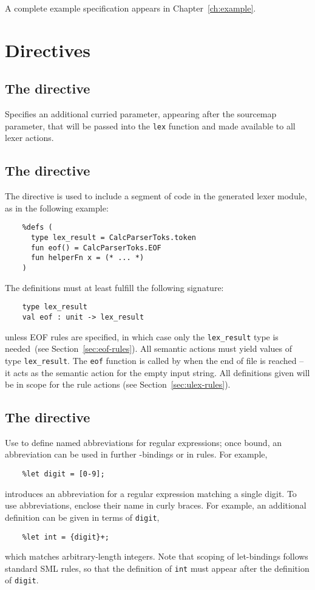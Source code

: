 A complete example specification appears in Chapter~\ref{ch:example}.

\section{Directives}

\subsection{The  directive}

Specifies an additional curried parameter, appearing after the sourcemap parameter, that will be passed into the \texttt{lex} function and made available to all lexer actions.

\subsection{The  directive}

The  directive is used to include a segment of code in the generated lexer module, as in the following example:
\begin{verbatim}
    %defs (
      type lex_result = CalcParserToks.token
      fun eof() = CalcParserToks.EOF
      fun helperFn x = (* ... *)
    )
\end{verbatim}
The definitions must at least fulfill the following signature:
\begin{verbatim}
    type lex_result
    val eof : unit -> lex_result
\end{verbatim}
unless EOF rules are specified, in which case only the {\tt lex\_result} type is needed~(see Section~\ref{sec:eof-rules}).
All semantic actions must yield values of type {\tt lex\_result}.  The {\tt eof} function is called by \ulex{} when the end of file is reached -- it acts as the semantic action for the empty input string.  All definitions given will be in scope for the rule actions (see Section~\ref{sec:ulex-rules}).

\subsection{The  directive}

Use  to define named abbreviations for regular expressions; once bound, an abbreviation can be used in further -bindings or in rules.  For example,
\begin{verbatim}
    %let digit = [0-9];
\end{verbatim}
introduces an abbreviation for a regular expression matching a single digit.  To use abbreviations, enclose their name in curly braces.  For example, an additional  definition can be given in terms of \texttt{digit},
\begin{verbatim}
    %let int = {digit}+;
\end{verbatim}
which matches arbitrary-length integers.  Note that scoping of let-bindings follows standard SML rules, so that the definition of \texttt{int} must appear after the definition of \texttt{digit}.

